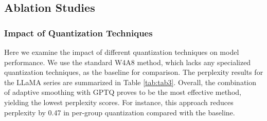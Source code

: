 \subsection{Ablation Studies}

\begin{table}[t]
\centering
\begin{small}
\renewcommand{\arraystretch}{1.3}
\end{small}
\caption{WikiText2 perplexity of LLaMA series when applying various quantization techniques. 'B' represents the Baseline, which refers to the vanilla W4A8 method without any additional quantization techniques. 'AS' denotes Adaptive Smoothing.
}
\label{tab:tab3}
\end{table}

\subsubsection{Impact of Quantization Techniques}
Here we examine the impact of different quantization techniques on model performance. We use the standard W4A8 method, which lacks any specialized quantization techniques, as the baseline for comparison. The perplexity results for the LLaMA series are summarized in Table \ref{tab:tab3}. Overall, the combination of adaptive smoothing with GPTQ proves to be the most effective method, yielding the lowest perplexity scores. For instance, this approach reduces perplexity by 0.47 in per-group quantization compared with the baseline.


